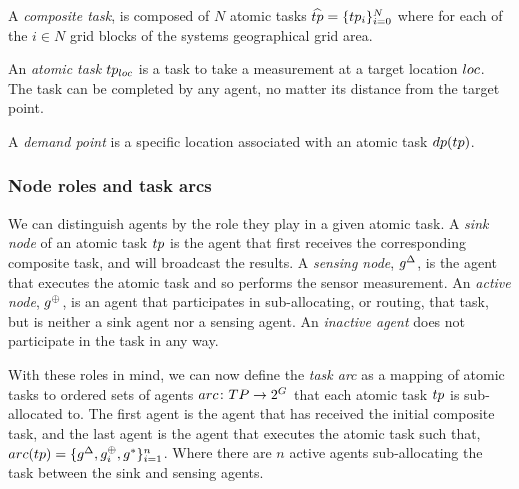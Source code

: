 \begin{definition}
	A \textit{composite task}, is composed of $N$ atomic tasks $\varCompositeTask{}{} = \lbrace \varAtomicTask{i}{} \rbrace_{i=0}^N$ where for each of the $i\in N$ grid blocks of the systems geographical grid area.
\end{definition}

\begin{definition}
	An \textit{atomic task} $\varAtomicTask{\varLocation{}{}}{}$ is a task to take a measurement at a target location $\varLocation{}{}$. The task can be completed by any agent, no matter its distance from the target point.
\end{definition}

\begin{definition}
	A \textit{demand point} is a specific location associated with an atomic task $\functionTaskDemandPoint{}{}$.
\end{definition}


\subsubsection*{Node roles and task arcs}
We can distinguish agents by the role they play in a given atomic task. A \textit{sink node} of an atomic task $\varAtomicTask{}{}$ is the agent that first receives the corresponding composite task, and will broadcast the results. A \textit{sensing node}, $g_{}^{\Delta}$, is the agent that executes the atomic task and so performs the sensor measurement. An \textit{active node}, $g_{}^{\oplus}$, is an agent that participates in sub-allocating, or routing, that task, but is neither a sink agent nor a sensing agent. An \textit{inactive agent} does not participate in the task in any way.

With these roles in mind, we can now define the \textit{task arc} as a mapping of atomic tasks to ordered sets of agents $\formalTaskArc{}{}$ that each atomic task $\varAtomicTask{}{}$ is sub-allocated to. The first agent is the agent that has received the initial composite task, and the last agent is the agent that executes the atomic task such that, 
$\functionTaskArc{}{} = \lbrace \varSinkAgent{}{}, \varActiveAgent{i}{}, \varSensingAgent{}{} \rbrace_{i=1}^{n}$. Where there are $n$ active agents sub-allocating the task between the sink and sensing agents.



